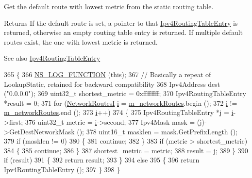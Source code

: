 Get the default route with lowest metric from the static routing table. 

\begin{DoxyReturn}{Returns}
If the default route is set, a pointer to that \hyperlink{classns3_1_1Ipv4RoutingTableEntry}{Ipv4\+Routing\+Table\+Entry} is returned, otherwise an empty routing table entry is returned. If multiple default routes exist, the one with lowest metric is returned.
\end{DoxyReturn}
\begin{DoxySeeAlso}{See also}
\hyperlink{classns3_1_1Ipv4RoutingTableEntry}{Ipv4\+Routing\+Table\+Entry} 
\end{DoxySeeAlso}

\begin{DoxyCode}
365 \{
366   \hyperlink{log-macros-disabled_8h_a90b90d5bad1f39cb1b64923ea94c0761}{NS\_LOG\_FUNCTION} (\textcolor{keyword}{this});
367   \textcolor{comment}{// Basically a repeat of LookupStatic, retained for backward compatibility}
368   Ipv4Address dest (\textcolor{stringliteral}{"0.0.0.0"});
369   uint32\_t shortest\_metric = 0xffffffff;
370   Ipv4RoutingTableEntry *result = 0;
371   \textcolor{keywordflow}{for} (\hyperlink{classns3_1_1Ipv4StaticRouting_a3d4f303cbea2117f36f3dd2da3ac59c9}{NetworkRoutesI} \hyperlink{bernuolliDistribution_8m_a6f6ccfcf58b31cb6412107d9d5281426}{i} = \hyperlink{classns3_1_1Ipv4StaticRouting_a81e0b111629b14fff2efbf69180a64c1}{m\_networkRoutes}.begin (); 
372        \hyperlink{bernuolliDistribution_8m_a6f6ccfcf58b31cb6412107d9d5281426}{i} != \hyperlink{classns3_1_1Ipv4StaticRouting_a81e0b111629b14fff2efbf69180a64c1}{m\_networkRoutes}.end (); 
373        \hyperlink{bernuolliDistribution_8m_a6f6ccfcf58b31cb6412107d9d5281426}{i}++) 
374     \{
375       Ipv4RoutingTableEntry *j = \hyperlink{bernuolliDistribution_8m_a6f6ccfcf58b31cb6412107d9d5281426}{i}->first;
376       uint32\_t metric = \hyperlink{bernuolliDistribution_8m_a6f6ccfcf58b31cb6412107d9d5281426}{i}->second;
377       Ipv4Mask mask = (j)->GetDestNetworkMask ();
378       uint16\_t masklen = mask.GetPrefixLength ();
379       \textcolor{keywordflow}{if} (masklen != 0)
380         \{
381           \textcolor{keywordflow}{continue};
382         \}
383       \textcolor{keywordflow}{if} (metric > shortest\_metric)
384         \{
385           \textcolor{keywordflow}{continue};
386         \}
387       shortest\_metric = metric;
388       result = j;
389     \}
390   \textcolor{keywordflow}{if} (result)
391     \{
392       \textcolor{keywordflow}{return} result;
393     \}
394   \textcolor{keywordflow}{else}
395     \{
396       \textcolor{keywordflow}{return} Ipv4RoutingTableEntry ();
397     \}
398 \}
\end{DoxyCode}


